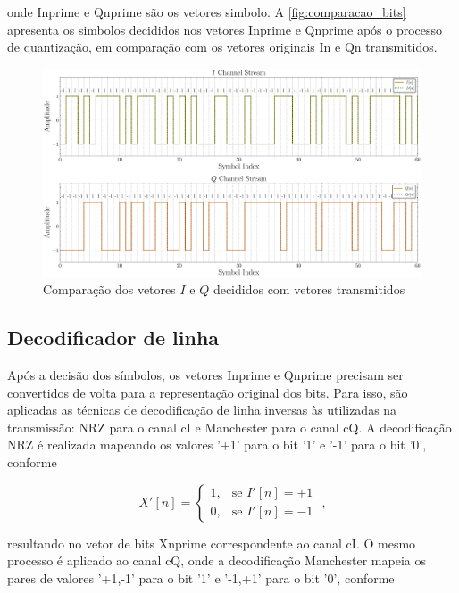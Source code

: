 \noindent onde \gls{Inprime} e \gls{Qnprime} são os vetores simbolo. A \autoref{fig:comparacao_bits} apresenta os simbolos decididos nos vetores \gls{Inprime} e \gls{Qnprime} após o processo de quantização, em comparação com os vetores originais \gls{In} e \gls{Qn} transmitidos.

\begin{figure}[H]
	\centering
	\caption{Comparação dos vetores $I$ e $Q$ decididos com vetores transmitidos}\label{fig:comparacao_bits}
	\includegraphics[width=\linewidth]{assets/cap2/example_sampler_symbols.pdf}
\end{figure}

\subsection{Decodificador de linha}

Após a decisão dos símbolos, os vetores \gls{Inprime} e \gls{Qnprime} precisam ser convertidos de volta para a representação original dos bits. Para isso, são aplicadas as técnicas de decodificação de linha inversas às utilizadas na transmissão: \gls{NRZ} para o canal \gls{cI} e \gls{Manchester} para o canal \gls{cQ}. A decodificação \gls{NRZ} é realizada mapeando os valores '+1' para o bit '1' e '-1' para o bit '0', conforme

\begin{equation}
    X'[n] = 
    \begin{cases}
    1, & \text{se } I'[n] = +1 \\
    0, & \text{se } I'[n] = -1
    \end{cases} \text{ ,}
\end{equation}


\noindent resultando no vetor de bits \gls{Xnprime} correspondente ao canal \gls{cI}. O mesmo processo é aplicado ao canal \gls{cQ}, onde a decodificação \gls{Manchester} mapeia os pares de valores '+1,-1' para o bit '1' e '-1,+1' para o bit '0', conforme


